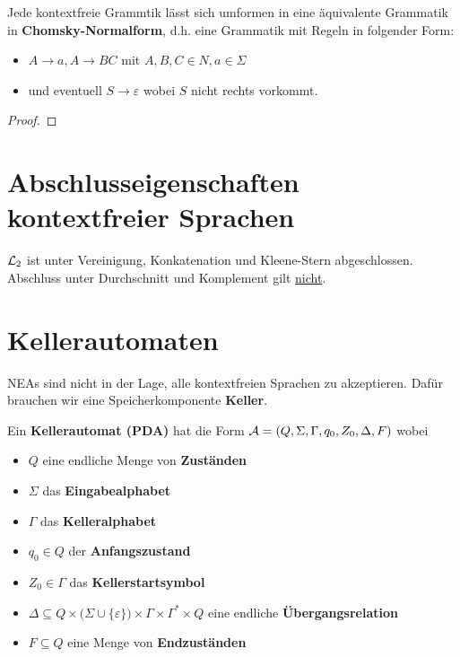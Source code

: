
\begin{satz}\label{atz8.12ChomskyNormalform}\enter
	Jede kontextfreie Grammtik lässt sich umformen in eine äquivalente Grammatik in \textbf{Chomsky-Normalform}, d.h. eine Grammatik mit Regeln in folgender Form:
	\begin{itemize}
		\item $A\to a,A\to BC$ mit $A,B,C\in N,a\in\Sigma$
		\item und eventuell $S\to\varepsilon$ wobei $S$ nicht rechts vorkommt.
	\end{itemize}
\end{satz}

\begin{proof}
\end{proof}

\section{Abschlusseigenschaften kontextfreier Sprachen} %

\begin{satz}\label{satz9.1}
	$\mathcal{L}_2$ ist unter Vereinigung, Konkatenation und Kleene-Stern abgeschlossen. 
	Abschluss unter Durchschnitt und Komplement gilt \underline{nicht}.
\end{satz}

\section{Kellerautomaten}
NEAs sind nicht in der Lage, alle kontextfreien Sprachen zu akzeptieren.
Dafür brauchen wir eine Speicherkomponente \textbf{Keller}.

\begin{definition}\label{def10.1Kellerautomat}
	Ein \textbf{Kellerautomat (PDA)} hat die Form $\mathcal{A}=(Q,\Sigma,\Gamma,q_0,Z_0,\Delta,F)$ wobei
	\begin{itemize}
		\item $Q$ eine endliche Menge von \textbf{Zuständen}
		\item $\Sigma$ das \textbf{Eingabealphabet}
		\item $\Gamma$ das \textbf{Kelleralphabet}
		\item $q_0\in Q$ der \textbf{Anfangszustand}
		\item $Z_0\in\Gamma$ das \textbf{Kellerstartsymbol}
		\item $\Delta\subseteq Q\times\big(\Sigma\cup\lbrace\varepsilon\rbrace\big)\times\Gamma\times\Gamma^\ast\times Q$ eine endliche \textbf{Übergangsrelation}
		\item $F\subseteq Q$ eine Menge von \textbf{Endzuständen}
	\end{itemize}
\end{definition}


